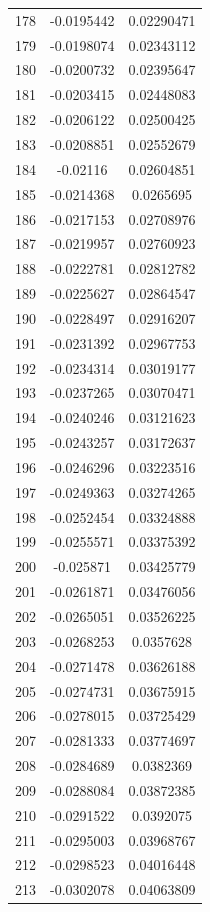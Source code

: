 \documentclass[a4paper, 11pt, oneside]{report}
\begin{document}
{\begin{longtable}{|c|c|c|}
178 & -0.0195442 & 0.02290471 \\
179 & -0.0198074 & 0.02343112 \\
180 & -0.0200732 & 0.02395647 \\
181 & -0.0203415 & 0.02448083 \\
182 & -0.0206122 & 0.02500425 \\
183 & -0.0208851 & 0.02552679 \\
184 & -0.02116   & 0.02604851 \\
185 & -0.0214368 & 0.0265695  \\
186 & -0.0217153 & 0.02708976 \\
187 & -0.0219957 & 0.02760923 \\
188 & -0.0222781 & 0.02812782 \\
189 & -0.0225627 & 0.02864547 \\
190 & -0.0228497 & 0.02916207 \\
191 & -0.0231392 & 0.02967753 \\
192 & -0.0234314 & 0.03019177 \\
193 & -0.0237265 & 0.03070471 \\
194 & -0.0240246 & 0.03121623 \\
195 & -0.0243257 & 0.03172637 \\
196 & -0.0246296 & 0.03223516 \\
197 & -0.0249363 & 0.03274265 \\
198 & -0.0252454 & 0.03324888 \\
199 & -0.0255571 & 0.03375392 \\
200 & -0.025871  & 0.03425779 \\
201 & -0.0261871 & 0.03476056 \\
202 & -0.0265051 & 0.03526225 \\
203 & -0.0268253 & 0.0357628  \\
204 & -0.0271478 & 0.03626188 \\
205 & -0.0274731 & 0.03675915 \\
206 & -0.0278015 & 0.03725429 \\
207 & -0.0281333 & 0.03774697 \\
208 & -0.0284689 & 0.0382369  \\
209 & -0.0288084 & 0.03872385 \\
210 & -0.0291522 & 0.0392075  \\
211 & -0.0295003 & 0.03968767 \\
212 & -0.0298523 & 0.04016448 \\
213 & -0.0302078 & 0.04063809 \\

\end{longtable}}
\end{document}
